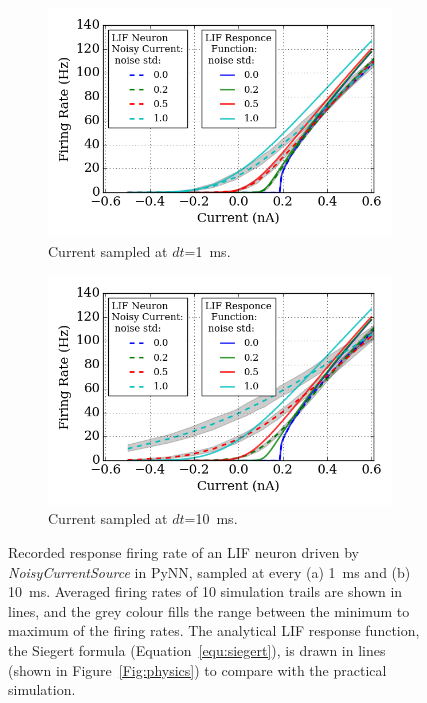 	\begin{figure}[tbp!]
		\centering
		\begin{subfigure}[t]{0.49\textwidth}
			\DIFdelbeginFL %
\DIFdelendFL \DIFaddbeginFL \includegraphics[width=\textwidth]{pics_iconip/revise_2-1.png}
			\DIFaddendFL \caption{Current sampled at $dt$=1~ms.}
		\end{subfigure}
		\begin{subfigure}[t]{0.49\textwidth}
			\DIFdelbeginFL %
\DIFdelendFL \DIFaddbeginFL \includegraphics[width=\textwidth]{pics_iconip/revise_2-2.png}
			\DIFaddendFL \caption{Current sampled at $dt$=10~ms.}
		\end{subfigure}
		\caption[Recorded response firing rate driven by \textit{NoisyCurrentSource}.]{Recorded response firing rate of an LIF neuron driven by \textit{NoisyCurrentSource} in PyNN, sampled at every (a) 1~ms and (b) 10~ms. Averaged firing rates of 10 simulation trails are shown in \DIFdelbeginFL {}\DIFdelendFL \DIFaddbeginFL {}\DIFaddendFL lines, and the grey colour fills the range between the minimum to maximum of the firing rates. The analytical LIF response function, the Siegert formula (Equation~\ref{equ:siegert}), is drawn in \DIFdelbeginFL {}\DIFdelendFL \DIFaddbeginFL {}\DIFaddendFL lines (shown in Figure~\ref{Fig:physics}) to compare with the practical simulation.}
		\label{Fig:current}
	\end{figure}

